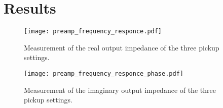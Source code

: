 \section*{Results}

\begin{figure}[htbp!]
	\centering
		\texttt{[image: preamp\_frequency\_responce.pdf]}
		\caption{Measurement of the real output impedance of the three pickup settings.}
		\label{fig:appendix:preamp_amplitude}
		\texttt{[image: preamp\_frequency\_responce\_phase.pdf]}
		\caption{Measurement of the imaginary output impedance of the three pickup settings.}
		\label{fig:appendix:preamp_phase}
\end{figure}
